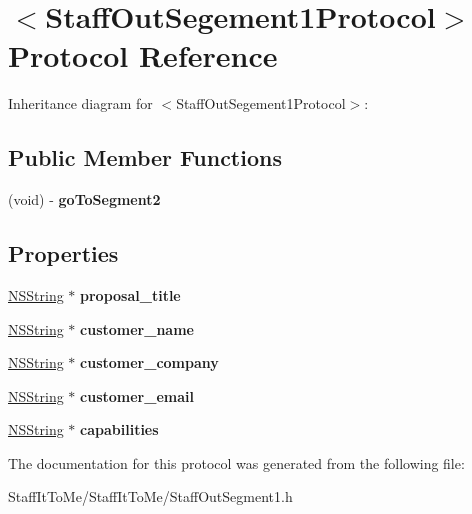 \hypertarget{protocol_staff_out_segement1_protocol-p}{
\section{$<$\-Staff\-Out\-Segement1\-Protocol$>$ \-Protocol \-Reference}
\label{protocol_staff_out_segement1_protocol-p}
}


\-Inheritance diagram for $<$\-Staff\-Out\-Segement1\-Protocol$>$\-:
\subsection*{\-Public \-Member \-Functions}
\begin{DoxyCompactItemize}
\item 
\hypertarget{protocol_staff_out_segement1_protocol-p_ad8a8ec10534624ba1e3c93a96d5cf655}{
(void) -\/ {\bfseries go\-To\-Segment2}}
\label{protocol_staff_out_segement1_protocol-p_ad8a8ec10534624ba1e3c93a96d5cf655}

\end{DoxyCompactItemize}
\subsection*{\-Properties}
\begin{DoxyCompactItemize}
\item 
\hypertarget{protocol_staff_out_segement1_protocol-p_aecb57a298b9ba58c1493a9d43663cf7f}{
\hyperlink{class_n_s_string}{\-N\-S\-String} $\ast$ {\bfseries proposal\-\_\-title}}
\label{protocol_staff_out_segement1_protocol-p_aecb57a298b9ba58c1493a9d43663cf7f}

\item 
\hypertarget{protocol_staff_out_segement1_protocol-p_a455ea8ea1186673c3ee8741eb4225d77}{
\hyperlink{class_n_s_string}{\-N\-S\-String} $\ast$ {\bfseries customer\-\_\-name}}
\label{protocol_staff_out_segement1_protocol-p_a455ea8ea1186673c3ee8741eb4225d77}

\item 
\hypertarget{protocol_staff_out_segement1_protocol-p_a20a29f0a7c1e415267592b602413f78c}{
\hyperlink{class_n_s_string}{\-N\-S\-String} $\ast$ {\bfseries customer\-\_\-company}}
\label{protocol_staff_out_segement1_protocol-p_a20a29f0a7c1e415267592b602413f78c}

\item 
\hypertarget{protocol_staff_out_segement1_protocol-p_a6bc0101c5684b9ee4d9afe06ed7d9e08}{
\hyperlink{class_n_s_string}{\-N\-S\-String} $\ast$ {\bfseries customer\-\_\-email}}
\label{protocol_staff_out_segement1_protocol-p_a6bc0101c5684b9ee4d9afe06ed7d9e08}

\item 
\hypertarget{protocol_staff_out_segement1_protocol-p_a1140260c8b3222d19c5e17a9df95ab9e}{
\hyperlink{class_n_s_string}{\-N\-S\-String} $\ast$ {\bfseries capabilities}}
\label{protocol_staff_out_segement1_protocol-p_a1140260c8b3222d19c5e17a9df95ab9e}

\end{DoxyCompactItemize}


\-The documentation for this protocol was generated from the following file\-:\begin{DoxyCompactItemize}
\item 
\-Staff\-It\-To\-Me/\-Staff\-It\-To\-Me/\-Staff\-Out\-Segment1.\-h\end{DoxyCompactItemize}
